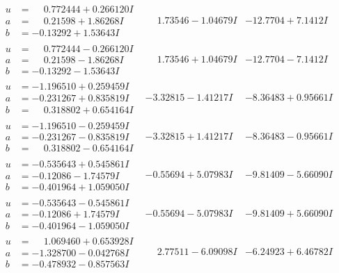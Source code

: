 \documentclass[1p]{elsarticle_modified}
\theoremstyle{definition}
\begin{document}
$$\begin{array}{c|c|c}
\begin{aligned}
u &= \phantom{-}0.772444 + 0.266120 I \\
a &= \phantom{-}0.21598 + 1.86268 I \\
b &= -0.13292 + 1.53643 I\end{aligned}
 & \phantom{-}1.73546 - 1.04679 I & -12.7704 + 7.1412 I \\ \hline\begin{aligned}
u &= \phantom{-}0.772444 - 0.266120 I \\
a &= \phantom{-}0.21598 - 1.86268 I \\
b &= -0.13292 - 1.53643 I\end{aligned}
 & \phantom{-}1.73546 + 1.04679 I & -12.7704 - 7.1412 I \\ \hline\begin{aligned}
u &= -1.196510 + 0.259459 I \\
a &= -0.231267 + 0.835819 I \\
b &= \phantom{-}0.318802 + 0.654164 I\end{aligned}
 & -3.32815 - 1.41217 I & -8.36483 + 0.95661 I \\ \hline\begin{aligned}
u &= -1.196510 - 0.259459 I \\
a &= -0.231267 - 0.835819 I \\
b &= \phantom{-}0.318802 - 0.654164 I\end{aligned}
 & -3.32815 + 1.41217 I & -8.36483 - 0.95661 I \\ \hline\begin{aligned}
u &= -0.535643 + 0.545861 I \\
a &= -0.12086 - 1.74579 I \\
b &= -0.401964 + 1.059050 I\end{aligned}
 & -0.55694 + 5.07983 I & -9.81409 - 5.66090 I \\ \hline\begin{aligned}
u &= -0.535643 - 0.545861 I \\
a &= -0.12086 + 1.74579 I \\
b &= -0.401964 - 1.059050 I\end{aligned}
 & -0.55694 - 5.07983 I & -9.81409 + 5.66090 I \\ \hline\begin{aligned}
u &= \phantom{-}1.069460 + 0.653928 I \\
a &= -1.328700 - 0.042768 I \\
b &= -0.478932 - 0.857563 I\end{aligned}
 & \phantom{-}2.77511 - 6.09098 I & -6.24923 + 6.46782 I \\ \hline\begin{aligned}

\end{aligned}
\end{array}$$
\end{document}
